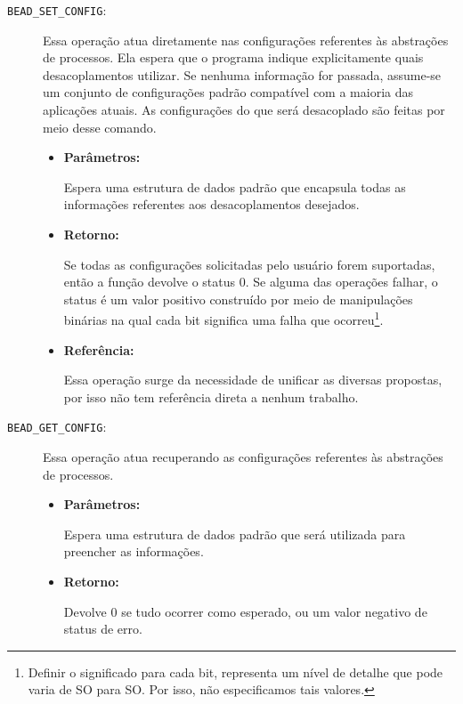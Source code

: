 \begin{description}
  \item [\texttt{BEAD\_SET\_CONFIG}:]

Essa operação atua diretamente nas configurações referentes às abstrações de
processos. Ela espera que o programa indique explicitamente quais
desacoplamentos utilizar. Se nenhuma informação for passada, assume-se um
conjunto de configurações padrão compatível com a maioria das aplicações
atuais. As configurações do que será desacoplado são feitas por meio desse comando.

  \begin{itemize}
    \item \textbf{Parâmetros:}

Espera uma estrutura de dados padrão que encapsula todas as informações
referentes aos desacoplamentos desejados.

    \item \textbf{Retorno:}

Se todas as configurações solicitadas pelo usuário forem suportadas, então a
função devolve o status 0. Se alguma das operações falhar, o status é um valor
positivo construído por meio de manipulações binárias na qual cada bit
significa uma falha que ocorreu\footnote{Definir o significado para cada bit,
representa um nível de detalhe que pode varia de SO para SO. Por isso, não
especificamos tais valores.}. 

    \item \textbf{Referência:}

Essa operação surge da necessidade de unificar as diversas propostas, por isso
não tem referência direta a nenhum trabalho.

  \end{itemize}

  \item [\texttt{BEAD\_GET\_CONFIG}:]

Essa operação atua recuperando as configurações referentes às abstrações de
processos. 

  \begin{itemize}
    \item \textbf{Parâmetros:}

Espera uma estrutura de dados padrão que será utilizada para preencher as
informações.

    \item \textbf{Retorno:}

Devolve 0 se tudo ocorrer como esperado, ou um valor negativo de status de
erro.


\end{itemize}
\end{description}
